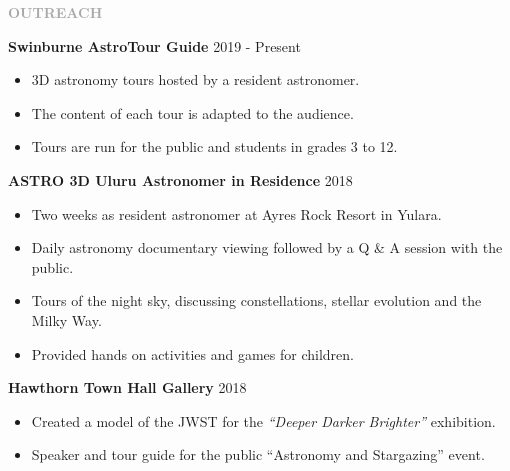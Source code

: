\documentclass[11pt]{extarticle}
\def\Vhrulefill{{\color{BurntOrange}{\leavevmode\leaders\hrule height 1.2ex depth \dimexpr0.5pt-0.9ex\hfill\kern5pt}}}
\begin{document}
\vspace{3ex}
\noindent
\textcolor{darkgray}{\Large\normalfont\bfseries\MakeUppercase{Outreach}} \Vhrulefill
\vspace{2ex}




\noindent
\textbf{Swinburne AstroTour Guide} \hfill 2019 - Present
\begin{itemize}[noitemsep]
    \item 3D astronomy tours hosted by a resident astronomer.  
    \item The content of each tour is adapted to the audience.
    \item Tours are run for the public and students in grades 3 to 12. 
\end{itemize}

\noindent
\textbf{ASTRO 3D Uluru Astronomer in Residence} \hfill 2018 \par 
{}
\begin{itemize}[noitemsep]
\item Two weeks as resident astronomer at Ayres Rock Resort in Yulara.
\item Daily astronomy documentary viewing followed by a Q \& A session with the public.
\item Tours of the night sky, discussing constellations, stellar evolution and the Milky Way.
\item Provided hands on activities and games for children.
\end{itemize}

\noindent
\textbf{Hawthorn Town Hall Gallery} \hfill 2018 \par 
{}
\begin{itemize}[noitemsep]
\item Created a model of the JWST for the \emph{``Deeper Darker Brighter''} exhibition.
\item Speaker and tour guide for the public ``Astronomy and Stargazing'' event. 
\end{itemize}
\end{document}
